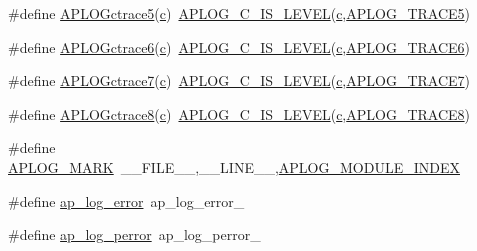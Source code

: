 \begin{DoxyCompactItemize}
\#define \hyperlink{group__APACHE__CORE__LOG_ga1998e307c1268d62ec3f3ea073bd98e4}{A\+P\+L\+O\+Gctrace5}(\hyperlink{pcregrep_8txt_aef720ae5f62fa015619d00171d917416}{c})~\hyperlink{group__APACHE__CORE__LOG_ga908c272570434c93c7a833f60aef30f8}{A\+P\+L\+O\+G\+\_\+\+C\+\_\+\+I\+S\+\_\+\+L\+E\+V\+EL}(\hyperlink{pcregrep_8txt_aef720ae5f62fa015619d00171d917416}{c},\hyperlink{group__APACHE__CORE__LOG_gab1a4bc833fc60cfbb6bc89eaa6550a2c}{A\+P\+L\+O\+G\+\_\+\+T\+R\+A\+C\+E5})
\item 
\#define \hyperlink{group__APACHE__CORE__LOG_ga23c736a4c9602da83b6f06810dd36ef7}{A\+P\+L\+O\+Gctrace6}(\hyperlink{pcregrep_8txt_aef720ae5f62fa015619d00171d917416}{c})~\hyperlink{group__APACHE__CORE__LOG_ga908c272570434c93c7a833f60aef30f8}{A\+P\+L\+O\+G\+\_\+\+C\+\_\+\+I\+S\+\_\+\+L\+E\+V\+EL}(\hyperlink{pcregrep_8txt_aef720ae5f62fa015619d00171d917416}{c},\hyperlink{group__APACHE__CORE__LOG_gad067edc2e8853edaa2a1b54792b62f87}{A\+P\+L\+O\+G\+\_\+\+T\+R\+A\+C\+E6})
\item 
\#define \hyperlink{group__APACHE__CORE__LOG_gac2640d0550a1d7825fb89f2bde14209d}{A\+P\+L\+O\+Gctrace7}(\hyperlink{pcregrep_8txt_aef720ae5f62fa015619d00171d917416}{c})~\hyperlink{group__APACHE__CORE__LOG_ga908c272570434c93c7a833f60aef30f8}{A\+P\+L\+O\+G\+\_\+\+C\+\_\+\+I\+S\+\_\+\+L\+E\+V\+EL}(\hyperlink{pcregrep_8txt_aef720ae5f62fa015619d00171d917416}{c},\hyperlink{group__APACHE__CORE__LOG_ga90c9ee0877e812054113ea3c9385a231}{A\+P\+L\+O\+G\+\_\+\+T\+R\+A\+C\+E7})
\item 
\#define \hyperlink{group__APACHE__CORE__LOG_gac6a0ac11f123729a40bc2ae53d5039bf}{A\+P\+L\+O\+Gctrace8}(\hyperlink{pcregrep_8txt_aef720ae5f62fa015619d00171d917416}{c})~\hyperlink{group__APACHE__CORE__LOG_ga908c272570434c93c7a833f60aef30f8}{A\+P\+L\+O\+G\+\_\+\+C\+\_\+\+I\+S\+\_\+\+L\+E\+V\+EL}(\hyperlink{pcregrep_8txt_aef720ae5f62fa015619d00171d917416}{c},\hyperlink{group__APACHE__CORE__LOG_ga08fc65b391ff4c007f69cd46f4423ac3}{A\+P\+L\+O\+G\+\_\+\+T\+R\+A\+C\+E8})
\item 
\#define \hyperlink{group__APACHE__CORE__LOG_ga655e126996849bcb82e4e5a14c616f4a}{A\+P\+L\+O\+G\+\_\+\+M\+A\+RK}~\+\_\+\+\_\+\+F\+I\+L\+E\+\_\+\+\_\+,\+\_\+\+\_\+\+L\+I\+N\+E\+\_\+\+\_\+,\hyperlink{vhost_8c_ae75325996d1b2cf6120dded4cb153a22}{A\+P\+L\+O\+G\+\_\+\+M\+O\+D\+U\+L\+E\+\_\+\+I\+N\+D\+EX}
\item 
\#define \hyperlink{group__APACHE__CORE__LOG_ga5e6676c87418af7a1d323a116c78ecb4}{ap\+\_\+log\+\_\+error}~ap\+\_\+log\+\_\+error\+\_\+
\item 
\#define \hyperlink{group__APACHE__CORE__LOG_ga6cc9f8ca3eb1a5010390a4883c416d0b}{ap\+\_\+log\+\_\+perror}~ap\+\_\+log\+\_\+perror\+\_\+

\end{DoxyCompactItemize}
